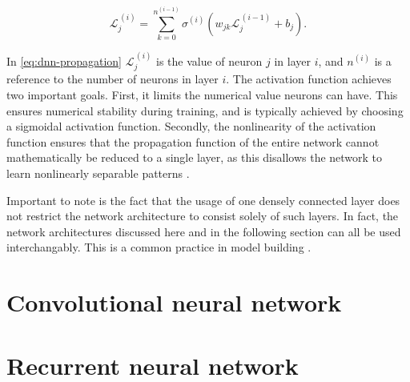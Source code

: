 \begin{equation}
\label{eq:dnn-propagation}
\mathcal{L}_j^{\,(i)} = \sum\limits_{k = 0}^{n^{(i-1)}} \sigma^{(i)}\left( w_{jk} \mathcal{L}_j^{\,(i-1)} + b_j\right).
\end{equation}

In \autoref{eq:dnn-propagation} $\mathcal{L}_j^{\,(i)}$ is the value of neuron $j$ in layer $i$, and $n^{(i)}$ is a reference to the number of neurons in 
layer $i$. The activation function achieves two important goals. First, it limits the numerical value neurons can have. This ensures numerical stability
during training, and is typically achieved by choosing a sigmoidal activation function. Secondly, the nonlinearity of the activation function ensures that 
the propagation function of the entire network cannot mathematically be reduced to a single layer, as this disallows the network to learn nonlinearly 
separable patterns \cite{russell2010artificial}. 

Important to note is the fact that the usage of one densely connected layer does not restrict the network architecture to consist solely of such layers. 
In fact, the network architectures discussed here and in the following section can all be used interchangably. This is a common practice in model building
\cite{szegedy2015going, krizhevsky2017imagenet}.


\section{Convolutional neural network}
\label{sec:CNN}



\section{Recurrent neural network}
\label{sec:RNN}